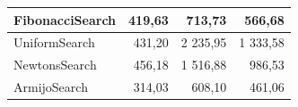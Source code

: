 \documentclass[a4paper,english,titlepage,12pt]{article}
\begin{document}
\begin{table}[]
\begin{tabular}{|l|r|r|r|}
    FibonacciSearch                                                           & 419,63                                                    & \cellcolor[HTML]{C9E9D9}713,73                           & \cellcolor[HTML]{A5DABF}566,68                                \\ \hline
    UniformSearch                                                             & 431,20                                                    & \cellcolor[HTML]{E67B73}2 235,95                         & \cellcolor[HTML]{EDA19C}1 333,58                              \\ \hline
    NewtonsSearch                                                             & 456,18                                                    & \cellcolor[HTML]{EDA19C}1 516,88                         & \cellcolor[HTML]{F7D3D0}986,53                                \\ \hline
    ArmijoSearch                                                              & \cellcolor[HTML]{57BB89}314,03                            & \cellcolor[HTML]{57BB89}608,10                           & \cellcolor[HTML]{57BB89}461,06                                \\ \hline
    \end{tabular}
\end{table}
\end{document}
